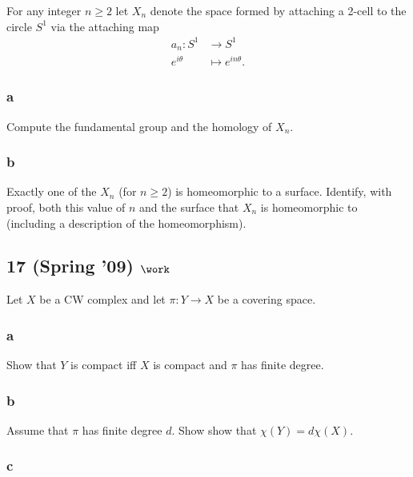 For any integer \(n \geq 2\) let \(X_n\) denote the space formed by
attaching a 2-cell to the circle \(S^1\) via the attaching map
\begin{align*}  
a_n: S^1 &\to S^1 \\
e^{i\theta} &\mapsto e^{in\theta}
.\end{align*}

\hypertarget{a-18}{%
\subsubsection{a}\label{a-18}}

Compute the fundamental group and the homology of \(X_n\).

\hypertarget{b-18}{%
\subsubsection{b}\label{b-18}}

Exactly one of the \(X_n\) (for \(n \geq 2\)) is homeomorphic to a
surface. Identify, with proof, both this value of \(n\) and the surface
that \(X_n\) is homeomorphic to (including a description of the
homeomorphism).

\hypertarget{spring-09-work-2}{%
\subsection{\texorpdfstring{17 (Spring '09)
\(\work\)}{17 (Spring '09) \textbackslash work}}\label{spring-09-work-2}}

Let \(X\) be a CW complex and let \(\pi : Y \to X\) be a covering space.

\hypertarget{a-19}{%
\subsubsection{a}\label{a-19}}

Show that \(Y\) is compact iff \(X\) is compact and \(\pi\) has finite
degree.

\hypertarget{b-19}{%
\subsubsection{b}\label{b-19}}

Assume that \(\pi\) has finite degree \(d\). Show show that
\(\chi (Y ) = d \chi (X)\).

\hypertarget{c-5}{%
\subsubsection{c}\label{c-5}}

